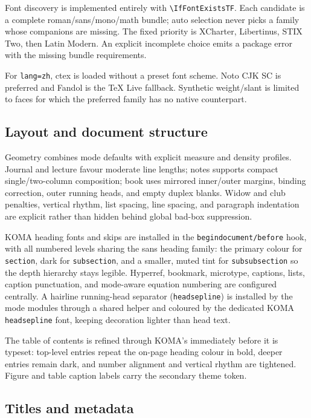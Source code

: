 \documentclass[a4paper,11pt]{scrartcl}
\begin{document}
Font discovery is implemented entirely with \verb|\IfFontExistsTF|. Each
candidate is a complete roman/sans/mono/math bundle; auto selection never picks
a family whose companions are missing. The fixed priority is XCharter,
Libertinus, STIX Two, then Latin Modern. An explicit incomplete choice emits a
package error with the missing bundle requirements.

For \texttt{lang=zh}, ctex is loaded without a preset font scheme. Noto CJK SC
is preferred and Fandol is the TeX Live fallback. Synthetic weight/slant is
limited to faces for which the preferred family has no native counterpart.

\subsection{Layout and document structure}

Geometry combines mode defaults with explicit measure and density profiles.
Journal and lecture favour moderate line lengths; notes supports compact
single/two-column composition; book uses mirrored inner/outer margins, binding
correction, outer running heads, and empty duplex blanks. Widow and club penalties,
vertical rhythm, list spacing, line spacing, and paragraph indentation are
explicit rather than hidden behind global bad-box suppression.

KOMA heading fonts and skips are installed in the
\texttt{begindocument/before} hook, with all numbered levels sharing the sans
heading family: the primary colour for \texttt{section}, dark for
\texttt{subsection}, and a smaller, muted tint for \texttt{subsubsection} so
the depth hierarchy stays legible. Hyperref, bookmark, microtype, captions,
lists, caption punctuation, and mode-aware equation numbering are configured centrally.
A hairline running-head separator (\texttt{headsepline}) is installed by the
mode modules through a shared helper and coloured by the dedicated KOMA
\texttt{headsepline} font, keeping decoration lighter than head text.

The table of contents is refined through KOMA's \texttt{\string\DeclareTOCStyleEntry}
immediately before it is typeset: top-level entries repeat the on-page heading
colour in bold, deeper entries remain dark, and number alignment and vertical
rhythm are tightened. Figure and table caption labels carry the secondary
theme token.

\subsection{Titles and metadata}
\end{document}
